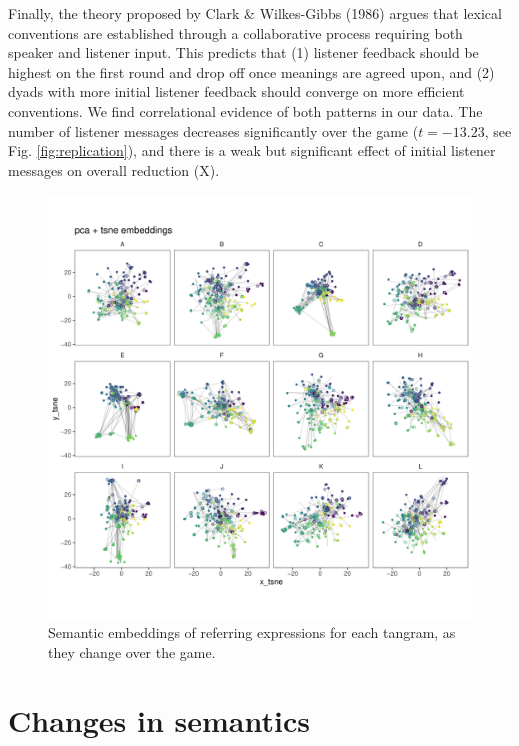 \documentclass[alpha-refs]{wiley-article}
\begin{document}
Finally, the theory proposed by Clark \& Wilkes-Gibbs (1986) argues that
lexical conventions are established through a collaborative process
requiring both speaker and listener input. This predicts that (1)
listener feedback should be highest on the first round and drop off once
meanings are agreed upon, and (2) dyads with more initial listener
feedback should converge on more efficient conventions. We find
correlational evidence of both patterns in our data. The number of
listener messages decreases significantly over the game (\(t = -13.23\),
see Fig. \ref{fig:replication}), and there is a weak but significant
effect of initial listener messages on overall reduction (X).

\begin{figure}[t]
\centering
\includegraphics[scale=.3]{tsne_embeddings.pdf}
\caption{Semantic embeddings of referring expressions for each tangram, as they change over the game. }
\label{fig:reduction}
\end{figure}

\section{Changes in semantics}
\end{document}

